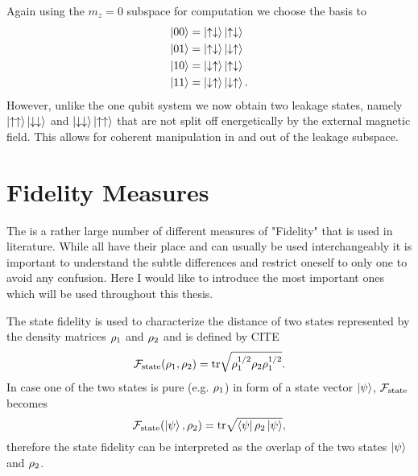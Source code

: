 Again using the $m_z=0$ subspace for computation we choose the basis to
\begin{align}
\ket{00} &= \ket{\uparrow \downarrow} \ket{\uparrow \downarrow}  \nonumber\\
\ket{01} &= \ket{\uparrow \downarrow} \ket{\downarrow \uparrow} \nonumber\\
\ket{10} &= \ket{\downarrow \uparrow} \ket{\uparrow \downarrow} \nonumber\\
\ket{11} &= \ket{\downarrow \uparrow} \ket{\downarrow \uparrow} .
\end{align}
However, unlike the one qubit system we now obtain two leakage states, namely $\ket{\uparrow \uparrow} \ket{\downarrow \downarrow}$ and $\ket{\downarrow \downarrow} \ket{\uparrow \uparrow}$ that are not split off energetically by the external magnetic field. This allows for coherent manipulation in and out of the leakage subspace.


\section{Fidelity Measures}
The is a rather large number of different measures of "Fidelity" that is used in literature. While all have their place and can usually be used interchangeably it is important to understand the subtle differences and restrict oneself to only one to avoid any confusion. Here I would like to introduce the most important ones which will be used throughout this thesis.

The state fidelity is used to characterize the distance of two states represented by the density matrices $\rho_1$ and $\rho_2$ and is defined by CITE
\begin{equation}
\mathcal{F}_\text{state}(\rho_1,\rho_2)=\mathrm{tr} \sqrt{\rho^{1/2}_1 \rho_2 \rho^{1/2}_1}.
\end{equation}
In case one of the two states is pure (e.g. $\rho_1$) in form of a state vector $\ket{\psi}$, $\mathcal{F}_\text{state}$ becomes
\begin{equation}
\mathcal{F}_\text{state}(\ket{\psi},\rho_2)=\mathrm{tr} \sqrt{\bra{\psi} \rho_2 \ket{\psi}},
\end{equation}
therefore the state fidelity can be interpreted as the overlap of the two states $\ket{\psi}$ and $\rho_2$.

